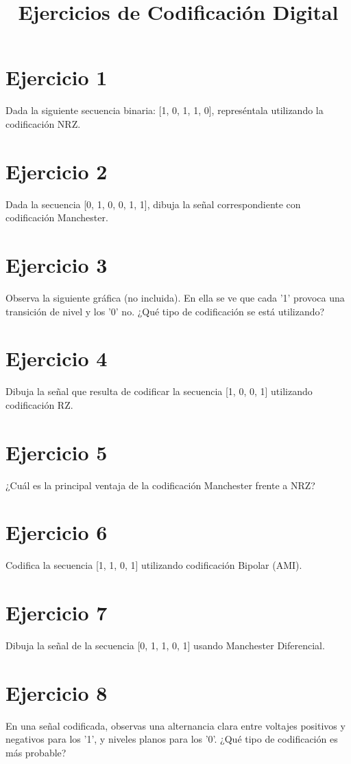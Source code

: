 \documentclass[a4paper,12pt]{article}
\title{Ejercicios de Codificación Digital}
\author{}
\date{}
\begin{document}
\maketitle
\section*{Ejercicio 1}
Dada la siguiente secuencia binaria: [1, 0, 1, 1, 0], represéntala utilizando la codificación NRZ.

\section*{Ejercicio 2}
Dada la secuencia [0, 1, 0, 0, 1, 1], dibuja la señal correspondiente con codificación Manchester.

\section*{Ejercicio 3}
Observa la siguiente gráfica (no incluida). En ella se ve que cada '1' provoca una transición de nivel y los '0' no. ¿Qué tipo de codificación se está utilizando?

\section*{Ejercicio 4}
Dibuja la señal que resulta de codificar la secuencia [1, 0, 0, 1] utilizando codificación RZ.

\section*{Ejercicio 5}
¿Cuál es la principal ventaja de la codificación Manchester frente a NRZ?

\section*{Ejercicio 6}
Codifica la secuencia [1, 1, 0, 1] utilizando codificación Bipolar (AMI).

\section*{Ejercicio 7}
Dibuja la señal de la secuencia [0, 1, 1, 0, 1] usando Manchester Diferencial.

\section*{Ejercicio 8}
En una señal codificada, observas una alternancia clara entre voltajes positivos y negativos para los '1', y niveles planos para los '0'. ¿Qué tipo de codificación es más probable?
\end{document}

